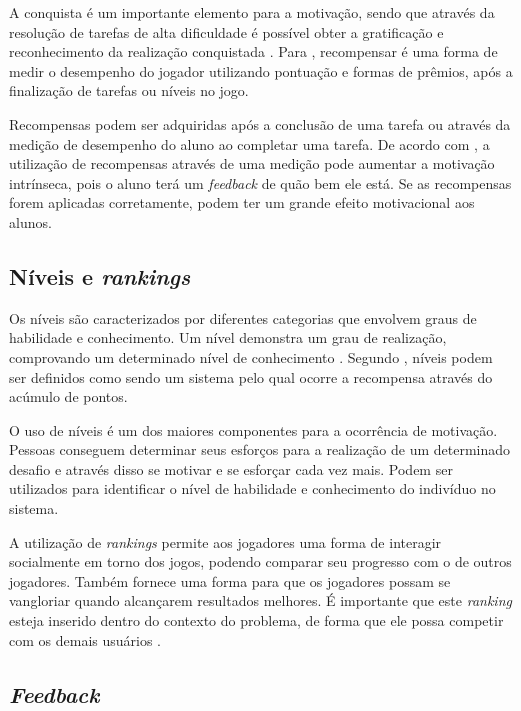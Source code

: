 \documentclass[
	12pt,				%
	oneside,			%
	a4paper,			%
	english,			%
	french,				%
	spanish,			%
	brazil,				%
	]{abntex2}
\begin{document}
A conquista é um importante elemento para a motivação, sendo que através da resolução de tarefas de alta dificuldade é possível obter a gratificação e reconhecimento da realização conquistada \cite{quadros2016gamificaccao}. Para \citet{busarello2016gamificaccao}, recompensar é uma forma de medir o desempenho do jogador utilizando pontuação e formas de prêmios, após a finalização de tarefas ou níveis no jogo.

Recompensas podem ser adquiridas após a conclusão de uma tarefa ou através da medição de desempenho do aluno ao completar uma tarefa. De acordo com \citet{quadros2016gamificaccao}, a utilização de recompensas através de uma medição pode aumentar a motivação intrínseca, pois o aluno terá um \textit{feedback} de quão bem ele está. Se as recompensas forem aplicadas corretamente, podem ter um grande efeito motivacional aos alunos.
    
\subsection{Níveis e \textit{rankings}}        

Os níveis são caracterizados por diferentes categorias que envolvem graus de habilidade e conhecimento. Um nível demonstra um grau de realização, comprovando um determinado nível de conhecimento \cite{kaap:2014}. Segundo \citet{quadros2016gamificaccao}, níveis podem ser definidos como sendo um sistema pelo qual ocorre a recompensa através do acúmulo de pontos.

O uso de níveis é um dos maiores componentes para a ocorrência de motivação. Pessoas conseguem determinar seus esforços para a realização de um determinado desafio e através disso se motivar e se esforçar cada vez mais. Podem ser utilizados para identificar o nível de habilidade e conhecimento do indivíduo no sistema.

A utilização de \textit{rankings} permite aos jogadores uma forma de interagir socialmente em torno dos jogos, podendo comparar seu progresso com o de outros jogadores. Também fornece uma forma para que os jogadores possam se vangloriar quando alcançarem resultados melhores. É importante que este \textit{ranking} esteja inserido dentro do contexto do problema, de forma que ele possa competir com os demais usuários \cite{quadros2016gamificaccao}.
    
\subsection{\textit{Feedback}}            
\end{document}
